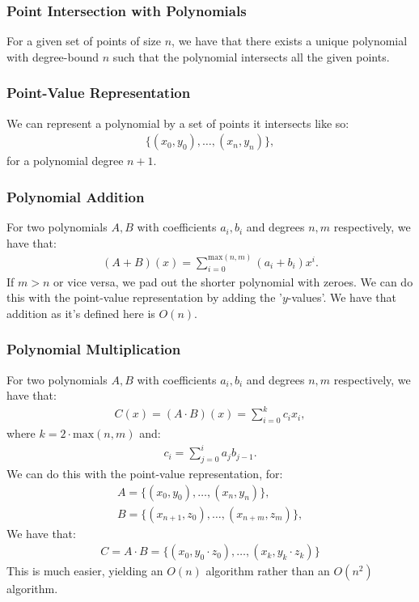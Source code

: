 \documentclass[a4paper, 12pt, twoside]{article}
\begin{document}
\subsubsection{Point Intersection with Polynomials}

For a given set of points of size $n$, we have that there exists a 
unique polynomial with degree-bound $n$ such that the polynomial
intersects all the given points.

\subsubsection{Point-Value Representation}

We can represent a polynomial by a set of points it intersects like so:
\begin{gather*}
  \{(x_0, y_0), \ldots, (x_n, y_n)\},
\end{gather*} for a polynomial degree $n + 1$.

\subsubsection{Polynomial Addition}

For two polynomials $A, B$ with coefficients $a_i, b_i$ and degrees $n, m$ 
respectively, we have that: \begin{gather*}
  (A + B)(x) =  \sum_{i = 0}^{\text{max}(n, m)}(a_i + b_i)x^i.
\end{gather*} If $m > n$ or vice versa, we pad out the shorter
polynomial with zeroes. We can do this with the point-value representation
by adding the '$y$-values'. We have that addition as it's defined here
is $O(n)$.

\subsubsection{Polynomial Multiplication}

For two polynomials $A, B$ with coefficients $a_i, b_i$ and degrees $n, m$ 
respectively, we have that: \begin{gather*}
  C(x) = (A \cdot B)(x) = \sum_{i = 0}^{k} c_ix_i,
\end{gather*} where $k = 2 \cdot \text{max}(n, m)$ and: \begin{gather*}
  c_i = \sum_{j = 0}^ia_jb_{j - 1}.
\end{gather*} We can do this with the point-value representation,
for: \begin{gather*}
  A = \{(x_0, y_0), \ldots, (x_n, y_n)\}, \\
  B = \{(x_{n + 1}, z_0), \ldots, (x_{n + m}, z_m)\},
\end{gather*} We have that: \begin{gather*}
  C = A \cdot B = \{(x_0, y_0 \cdot z_0), \ldots, (x_k, y_k \cdot z_k)\}
\end{gather*} This is much easier, yielding
an $O(n)$ algorithm rather than an $O(n^2)$ algorithm.
\end{document}
